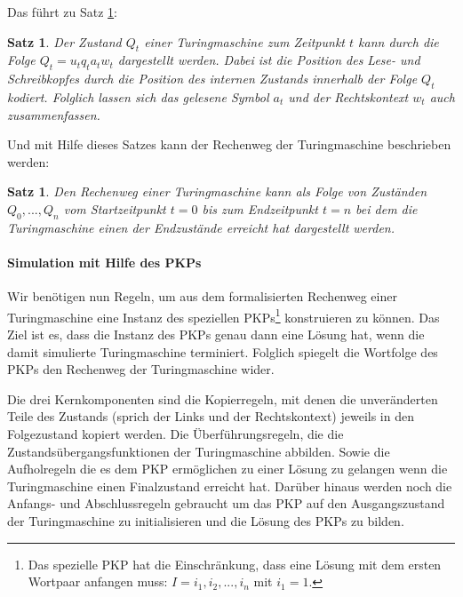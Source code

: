 \documentclass[]{scrartcl}
\newtheorem{satz}[definition]{Satz}
\begin{document}
			Das führt zu Satz \ref{satz-Turing-Zustand}:
			
			\begin{satz}
			\label{satz-Turing-Zustand}
			Der Zustand $Q_t$ einer Turingmaschine zum Zeitpunkt $t$ kann durch die Folge $Q_t = u_tq_ta_tw_t$ dargestellt werden. Dabei ist die Position des Lese- und Schreibkopfes durch die Position des internen Zustands innerhalb der Folge $Q_t$ kodiert. Folglich lassen sich das gelesene Symbol $a_t$ und der Rechtskontext $w_t$ auch zusammenfassen.
			\end{satz}
			
			Und mit Hilfe dieses Satzes kann der Rechenweg der Turingmaschine beschrieben werden:
			
			\begin{satz}
			Den Rechenweg einer Turingmaschine kann als Folge von Zuständen $Q_0, ..., Q_n$ vom Startzeitpunkt $t = 0$ bis zum Endzeitpunkt $t = n$ bei dem die Turingmaschine einen der Endzustände erreicht hat dargestellt werden.
			\end{satz}
		
		\paragraph{Simulation mit Hilfe des PKPs}
			Wir benötigen nun Regeln, um aus dem formalisierten Rechenweg einer Turingmaschine eine Instanz des speziellen PKPs\footnote{Das spezielle PKP hat die Einschränkung, dass eine Lösung mit dem ersten Wortpaar anfangen muss: $I = i_1, i_2, ..., i_n$ mit $i_1 = 1$.} konstruieren zu können. Das Ziel ist es, dass die Instanz des PKPs genau dann eine Lösung hat, wenn die damit simulierte Turingmaschine terminiert. Folglich spiegelt die Wortfolge des PKPs den Rechenweg der Turingmaschine wider.
			
			Die drei Kernkomponenten sind die Kopierregeln, mit denen die unveränderten Teile des Zustands (sprich der Links und der Rechtskontext) jeweils in den Folgezustand kopiert werden. Die Überführungsregeln, die die Zustandsübergangsfunktionen der Turingmaschine abbilden. Sowie die Aufholregeln die es dem PKP ermöglichen zu einer Lösung zu gelangen wenn die Turingmaschine einen Finalzustand erreicht hat. Darüber hinaus werden noch die Anfangs- und Abschlussregeln gebraucht um das PKP auf den Ausgangszustand der Turingmaschine zu initialisieren und die Lösung des PKPs zu bilden.
			
\end{document}
